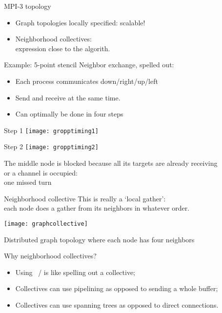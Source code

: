 \begin{numberedframe}{MPI-3 topology}
  \begin{itemize}
  \item Graph topologies locally specified: scalable!
  \item Neighborhood collectives:\\
    expression close to the algorith.
  \end{itemize}
\end{numberedframe}

\begin{numberedframe}{Example: 5-point stencil}
  Neighbor exchange,
  spelled out:
  \begin{itemize}
  \item Each process communicates down/right/up/left
  \item Send and receive at the same time.
  \item Can optimally be done in four steps
  \end{itemize}
\end{numberedframe}

\begin{numberedframe}{Step 1}
  \texttt{[image: gropptiming1]}
\end{numberedframe}

\begin{numberedframe}{Step 2}
  \texttt{[image: gropptiming2]}

  The middle node is blocked because all its targets
  are already receiving\\
  or a channel is occupied:\\
  one missed turn
\end{numberedframe}

\begin{numberedframe}{Neighborhood collective}
  \label{fig:graphcollective}
  This is really a `local gather':\\
  each node does a gather from its neighbors in whatever order.\\

  \texttt{[image: graphcollective]}

  Distributed graph topology where each
  node has four neighbors
\end{numberedframe}

\begin{numberedframe}{Why neighborhood collectives?}
  \begin{itemize}
  \item Using ~/  is like spelling out a collective;
  \item Collectives can use pipelining as opposed to sending  a whole
    buffer;
  \item Collectives can use spanning trees as opposed to direct connections.
  \end{itemize}
\end{numberedframe}

